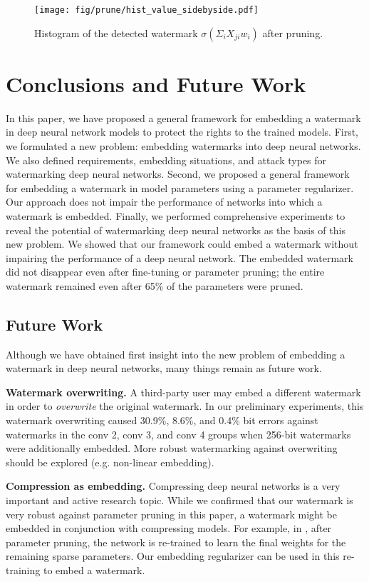 \documentclass[10pt,twocolumn,letterpaper]{article}
\begin{document}
\begin{figure}[tb]
	\centering
	\texttt{[image: fig/prune/hist\_value\_sidebyside.pdf]}
	\caption{Histogram of the detected watermark $\sigma(\Sigma_{i} X_{ji} w_i)$ after pruning.}
	\label{fig:hist_pruned}
\end{figure}



\section{Conclusions and Future Work}
In this paper, we have proposed a general framework for embedding a watermark in deep neural network models to protect the rights to the trained models.
First, we formulated a new problem: embedding watermarks into deep neural networks.
We also defined requirements, embedding situations, and attack types for watermarking deep neural networks.
Second, we proposed a general framework for embedding a watermark in model parameters using a parameter regularizer.
Our approach does not impair the performance of networks into which a watermark is embedded.
Finally, we performed comprehensive experiments to reveal the potential of watermarking deep neural networks as the basis of this new problem.
We showed that our framework could embed a watermark without impairing the performance of a deep neural network.
The embedded watermark did not disappear even after fine-tuning or parameter pruning; the entire watermark remained even after 65\% of the parameters were pruned.

\subsection{Future Work}
Although we have obtained first insight into the new problem of embedding a watermark in deep neural networks, many things remain as future work.

\textbf{Watermark overwriting.}
A third-party user may embed a different watermark in order to \textit{overwrite} the original watermark.
In our preliminary experiments, this watermark overwriting caused 30.9\%, 8.6\%, and 0.4\% bit errors against watermarks in the \textsf{conv 2}, \textsf{conv 3}, and \textsf{conv 4} groups when 256-bit watermarks were additionally embedded.
More robust watermarking against overwriting should be explored (e.g. non-linear embedding).

\textbf{Compression as embedding.}
Compressing deep neural networks is a very important and active research topic.
While we confirmed that our watermark is very robust against parameter pruning in this paper, a watermark might be embedded in conjunction with compressing models.
For example, in \cite{han_iclr16}, after parameter pruning, the network is re-trained to learn the final weights for the remaining sparse parameters.
Our embedding regularizer can be used in this re-training to embed a watermark.
\end{document}
